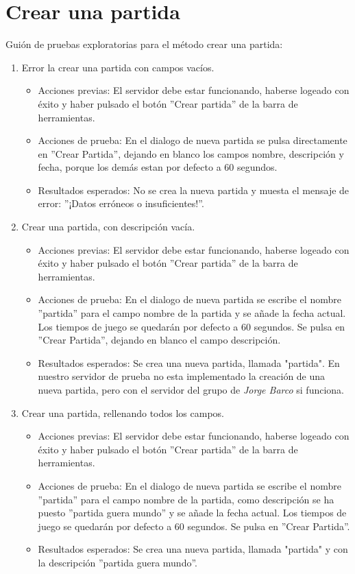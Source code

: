 \section{Crear una partida}

Guión de pruebas exploratorias para el método crear una partida:

\begin{enumerate}
\item Error la crear una partida con campos vacíos.
	\begin{itemize}
	\item Acciones previas: El servidor debe estar funcionando, haberse logeado con éxito y haber pulsado el botón ''Crear partida'' de la barra de herramientas.
	\item Acciones de prueba: En el dialogo de nueva partida se pulsa directamente en ''Crear Partida'', dejando en blanco los campos nombre, descripción y fecha, porque los demás estan por defecto a 60 segundos.
	\item Resultados esperados: No se crea la nueva partida y muesta el mensaje de error: ''¡Datos erróneos o insuficientes!''.
	\end{itemize}
	
\item Crear una partida, con descripción vacía.
	\begin{itemize}
	\item Acciones previas: El servidor debe estar funcionando, haberse logeado con éxito y haber pulsado el botón ''Crear partida'' de la barra de herramientas.
	\item Acciones de prueba: En el dialogo de nueva partida se escribe el nombre ''partida'' para el campo nombre de la partida y se añade la fecha actual. Los tiempos de juego se quedarán por defecto a 60 segundos. Se pulsa en ''Crear Partida'', dejando en blanco el campo descripción.
	\item Resultados esperados: Se crea una nueva partida, llamada "partida". En nuestro servidor de prueba no esta implementado la creación de una nueva partida, pero con el servidor del grupo de \textit{Jorge Barco} si funciona.
	\end{itemize}
	
\item Crear una partida, rellenando todos los campos.
	\begin{itemize}
	\item Acciones previas: El servidor debe estar funcionando, haberse logeado con éxito y haber pulsado el botón ''Crear partida'' de la barra de herramientas.
	\item Acciones de prueba: En el dialogo de nueva partida se escribe el nombre ''partida'' para el campo nombre de la partida, como descripción se ha puesto ''partida guera mundo'' y se añade la fecha actual. Los tiempos de juego se quedarán por defecto a 60 segundos. Se pulsa en ''Crear Partida''.
	\item Resultados esperados: Se crea una nueva partida, llamada "partida" y con la descripción ''partida guera mundo''.
	\end{itemize}
\end{enumerate}

